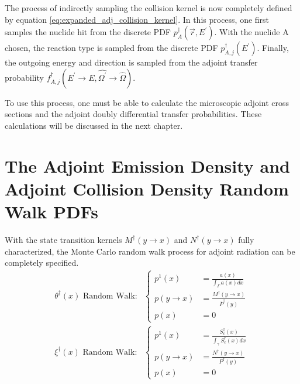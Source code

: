 The process of indirectly sampling the collision kernel is now completely 
defined by equation \ref{eq:expanded_adj_collision_kernel}. In this process,
one first samples the nuclide hit from the discrete PDF 
$p_A^{\dagger}(\vec{r},E^{'})$. With the nuclide A chosen, the reaction type is
sampled from the discrete PDF $p_{A,j}^{\dagger}(E^{'})$. Finally, the outgoing
energy and direction is sampled from the adjoint transfer probability
$f_{A,j}^{\dagger}(E^{'} \to E,\hat{\Omega^{'}} \to \hat{\Omega})$. 

To use this process, one must be able to calculate the microscopic adjoint
cross sections and the adjoint doubly differential transfer probabilities. 
These calculations will be discussed in the next chapter. 

\section{The Adjoint Emission Density and Adjoint Collision Density Random Walk PDFs}
With the state transition kernels $M^{\dagger}(y \to x)$ and 
$N^{\dagger}(y \to x)$ fully characterized, the Monte Carlo random walk process
for adjoint radiation can be completely specified. 
\begin{align}
  \theta^{\dagger}(x)\text{ Random Walk:}&
  \begin{cases}
    p^1(x) & = \frac{a(x)}{\int_{\Gamma} a(x)dx} \\
    p(y \to x) & = \frac{M^{\dagger}(y \to x)}{\overline{P}^{\dagger}(y)} \\
    p(x) & = 0
  \end{cases}
  \label{eq:mc_random_walk_adj_emission_dens} \\
  \xi^{\dagger}(x)\text{ Random Walk:}&
  \begin{cases}
    p^1(x) & = \frac{S_c^{\dagger}(x)}{\int_{\gamma} S_c^{\dagger}(x)dx} \\
    p(y \to x) & = \frac{N^{\dagger}(y \to x)}{P^{\dagger}(y)} \\
    p(x) & = 0
  \end{cases}
  \label{eq:mc_random_walk_adj_collision_dens}
\end{align}

